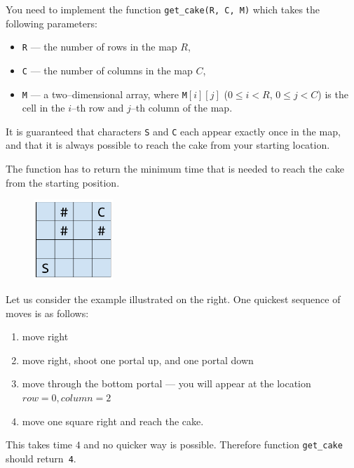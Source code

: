 \documentclass{../../../latex/boi2014}
\newcommand{\param}[1]{{\tt #1}}
\newcommand{\method}[1]{{\tt #1}}
\newcommand{\constant}[1]{{\tt #1}}
\begin{document}
    \Implementation
    You need to implement the function \method{get\_cake(R, C, M)}
    which takes the following parameters:
    \begin{itemize}
        \item \param{R} --- the number of rows in the map $R$,
        \item \param{C} --- the number of columns in the map $C$,
        \item \param{M} --- a two--dimensional array, where
            \param{M}$[i][j]$ ($0 \le i < R$, $0 \le j < C$) is the cell in
             the $i$--th row and $j$--th column of the map.
    \end{itemize}

    It is guaranteed that characters \constant{S} and \constant{C} each appear
    exactly once in the map, and that it is always possible to reach the cake
    from your starting location.

    The function has to return the minimum time that is needed to reach the cake
    from the starting position.

    \Example
    \begin{figure}
        \includegraphics[width=3cm]{fig-example}
    \end{figure}
    Let us consider the example illustrated on the right.
    One quickest sequence of moves is as follows:

    \begin{enumerate}
        \item move right
        \item move right, shoot one portal up, and one portal down
        \item move through the bottom portal --- you will appear at 
            the location $row = 0, column = 2$
        \item move one square right and reach the cake.
    \end{enumerate}

    This takes time $4$ and no quicker way is possible. Therefore
    function \method{get\_cake} should return~\constant{4}.

    \Scoring
\end{document}

